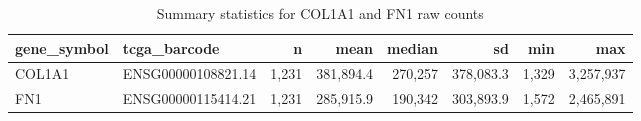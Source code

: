 \begin{table}[H]

\caption{\label{tab:unnamed-chunk-9}Summary statistics for COL1A1 and FN1 raw counts}
\centering
\begin{tabular}[t]{llrrrrrr}
\toprule
gene\_symbol & tcga\_barcode & n & mean & median & sd & min & max\\
\midrule
COL1A1 & ENSG00000108821.14 & 1,231 & 381,894.4 & 270,257 & 378,083.3 & 1,329 & 3,257,937\\
FN1 & ENSG00000115414.21 & 1,231 & 285,915.9 & 190,342 & 303,893.9 & 1,572 & 2,465,891\\
\bottomrule
\end{tabular}
\end{table}
